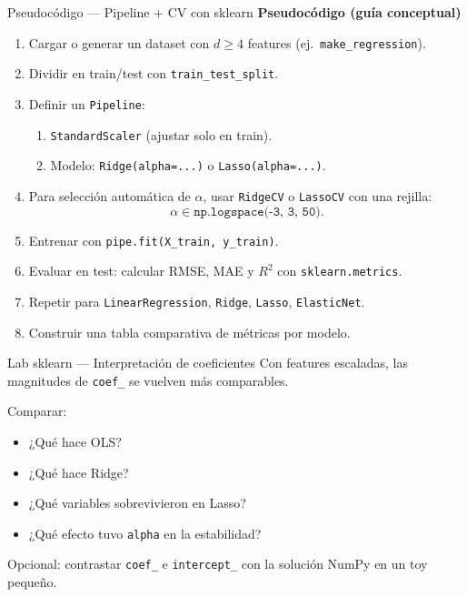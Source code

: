 \begin{frame}{Pseudocódigo — Pipeline + CV con sklearn}
\footnotesize
\textbf{Pseudocódigo (guía conceptual)}
\begin{enumerate}\footnotesize
  \item Cargar o generar un dataset con $d\ge 4$ features (ej.\ \texttt{make\_regression}).
  \item Dividir en train/test con \texttt{train\_test\_split}.
  \item Definir un \texttt{Pipeline}:
  \begin{enumerate}\scriptsize
    \item \texttt{StandardScaler} (ajustar solo en train).
    \item Modelo: \texttt{Ridge(alpha=...)} o \texttt{Lasso(alpha=...)}.
  \end{enumerate}
  \item Para selección automática de $\alpha$, usar \texttt{RidgeCV} o \texttt{LassoCV} con una rejilla:
  \[
    \alpha \in \texttt{np.logspace(-3, 3, 50)}.
  \]
  \item Entrenar con \texttt{pipe.fit(X\_train, y\_train)}.
  \item Evaluar en test: calcular RMSE, MAE y $R^2$ con \texttt{sklearn.metrics}.
  \item Repetir para \texttt{LinearRegression}, \texttt{Ridge}, \texttt{Lasso}, \texttt{ElasticNet}.
  \item Construir una tabla comparativa de métricas por modelo.
\end{enumerate}
\end{frame}

\begin{frame}{Lab sklearn — Interpretación de coeficientes}
Con features escaladas, las magnitudes de \texttt{coef\_} se vuelven más comparables.

\vspace{0.3em}
Comparar:
\begin{itemize}\small
  \item ¿Qué hace OLS?
  \item ¿Qué hace Ridge?
  \item ¿Qué variables sobrevivieron en Lasso?
  \item ¿Qué efecto tuvo \texttt{alpha} en la estabilidad?
\end{itemize}

\vspace{0.2em}
{\footnotesize Opcional: contrastar \texttt{coef\_} e \texttt{intercept\_} con la solución NumPy en un toy pequeño.}
\end{frame}

